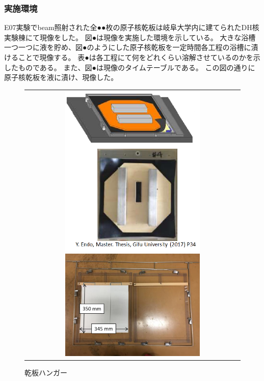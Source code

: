 \documentclass[12pt,a4paper]{jarticle}
\begin{document}
\subsubsection{実施環境}
E07実験でbeam照射された全●●枚の原子核乾板は岐阜大学内に建てられたDH核実験棟にて現像をした。
図●は現像を実施した環境を示している。
大きな浴槽一つ一つに液を貯め、図●のようにした原子核乾板を一定時間各工程の浴槽に漬けることで現像する。
表●は各工程にて何をどれくらい溶解させているのかを示したものである。
また、図●は現像のタイムテーブルである。
この図の通りに原子核乾板を液に漬け、現像した。
\begin{figure}[htbp]
  \centering
      \begin{tabular}{c}
        \begin{minipage}{0.5\hsize}
          \centering
            \includegraphics[clip, width=70mm]{tezyun_8.png}
            \hspace{1.6cm} 
            \caption{現像環境\label{fig:gennzou_bath}}
        \end{minipage}
        
        \begin{minipage}{0.5\hsize}
          \centering
            \includegraphics[clip, width=70mm]{refresh_hanga.png}
            \hspace{1.6cm} 
            \caption{乾板ハンガー\label{fig:emulsion_hanga}}
        \end{minipage}
    
      \end{tabular}
\end{figure}
\end{document}
